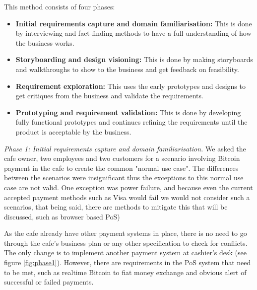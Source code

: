 This method consists of four phases:
\begin{itemize}

\item \textbf{Initial requirements capture and domain familiarisation: } This is done by interviewing and fact-finding methods to have a full understanding of how the business works.

\item \textbf{Storyboarding and design visioning: } This is done by making storyboards and walkthroughs to show to the business and get feedback on feasibility.

\item \textbf{Requirement exploration: } This uses the early prototypes  and designs to get critiques from the business and validate the requirements.

\item \textbf{Prototyping and requirement validation: } This is done by developing fully functional prototypes and continues refining the requirements until the product is acceptable by the business.

\end{itemize}

\textit{Phase 1: Initial requirements capture and domain familiarisation.} We asked the cafe owner, two employees and two customers for a scenario involving Bitcoin payment in the cafe to create the common "normal use case". The differences between the scenarios were insignificant thus the exceptions to this normal use case are not valid. One exception was power failure, and because even the current accepted payment methods such as Visa would fail we would not consider such a scenarios, that being said, there are methods to mitigate this that will be discussed, such as browser based PoS)


As the cafe already have other payment systems in place, there is no need to go through the cafe's business plan or any other specification to check for conflicts. The only change is to implement another payment system at cashier's desk (see figure \ref{fig:phase1}).
However, there are requirements in the PoS system that need to be met, such as realtime Bitcoin to fiat money exchange and obvious alert of successful or failed payments.


